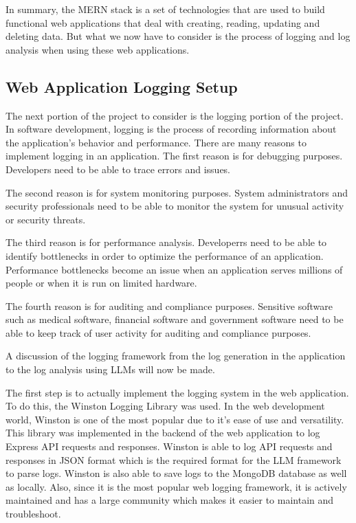 \documentclass[sigconf]{acmart}
\begin{document}
In summary, the MERN stack is a set of technologies that are used to build functional web applications that deal with creating, reading, updating and deleting data. But what we now have to consider is the process of logging and log analysis when using these web applications.

\subsection{Web Application Logging Setup}

The next portion of the project to consider is the logging portion of the project. In software development, logging is the process of recording information about the application's behavior and performance. There are many reasons to implement logging in an application. The first reason is for debugging purposes. Developers need to be able to trace errors and issues. 

The second reason is for system monitoring purposes. System administrators and security professionals need to be able to monitor the system for unusual activity or security threats.

The third reason is for performance analysis. Developerrs need to be able to identify bottlenecks in order to optimize the performance of an application. Performance bottlenecks become an issue when an application serves millions of people or when it is run on limited hardware.

The fourth reason is for auditing and compliance purposes. Sensitive software such as medical software, financial software and government software need to be able to keep track of user activity for auditing and compliance purposes.

A discussion of the logging framework from the log generation in the application to the log analysis using LLMs will now be made. 

The first step is to actually implement the logging system in the web application. To do this, the Winston Logging Library was used. In the web development world, Winston is one of the most popular due to it's ease of use and versatility. This library was implemented in the backend of the web application to log Express API requests and responses. Winston is able to log API requests and responses in JSON format which is the required format for the LLM framework to parse logs. Winston is also able to save logs to the MongoDB database as well as locally. Also, since it is the most popular web logging framework, it is actively maintained and has a large community which makes it easier to maintain and troubleshoot.
\end{document}
